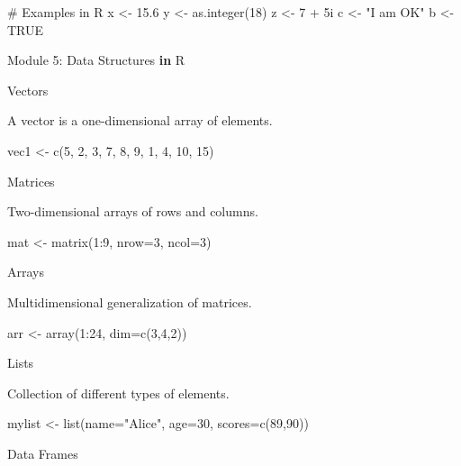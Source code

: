 \documentclass[
  letterpaper,
  DIV=11,
  numbers=noendperiod]{scrreprt}
\newenvironment{Shaded}{\begin{snugshade}}{\end{snugshade}}
\newcommand{\AttributeTok}[1]{\textcolor[rgb]{0.40,0.45,0.13}{#1}}
\newcommand{\CommentTok}[1]{\textcolor[rgb]{0.37,0.37,0.37}{#1}}
\newcommand{\ConstantTok}[1]{\textcolor[rgb]{0.56,0.35,0.01}{#1}}
\newcommand{\ControlFlowTok}[1]{\textcolor[rgb]{0.00,0.23,0.31}{\textbf{#1}}}
\newcommand{\DecValTok}[1]{\textcolor[rgb]{0.68,0.00,0.00}{#1}}
\newcommand{\FloatTok}[1]{\textcolor[rgb]{0.68,0.00,0.00}{#1}}
\newcommand{\FunctionTok}[1]{\textcolor[rgb]{0.28,0.35,0.67}{#1}}
\newcommand{\NormalTok}[1]{\textcolor[rgb]{0.00,0.23,0.31}{#1}}
\newcommand{\OtherTok}[1]{\textcolor[rgb]{0.00,0.23,0.31}{#1}}
\newcommand{\SpecialCharTok}[1]{\textcolor[rgb]{0.37,0.37,0.37}{#1}}
\newcommand{\StringTok}[1]{\textcolor[rgb]{0.13,0.47,0.30}{#1}}
\begin{document}
\begin{Shaded}
\begin{Highlighting}[]
\CommentTok{\# Examples in R}
\NormalTok{x }\OtherTok{\textless{}{-}} \FloatTok{15.6}
\NormalTok{y }\OtherTok{\textless{}{-}} \FunctionTok{as.integer}\NormalTok{(}\DecValTok{18}\NormalTok{)}
\NormalTok{z }\OtherTok{\textless{}{-}} \DecValTok{7} \SpecialCharTok{+} \DecValTok{5}\NormalTok{i}
\NormalTok{c }\OtherTok{\textless{}{-}} \StringTok{"I am OK"}
\NormalTok{b }\OtherTok{\textless{}{-}} \ConstantTok{TRUE}


\NormalTok{Module }\DecValTok{5}\SpecialCharTok{:}\NormalTok{ Data Structures }\ControlFlowTok{in}\NormalTok{ R}

\NormalTok{Vectors}

\NormalTok{A vector is a one}\SpecialCharTok{{-}}\NormalTok{dimensional array of elements.}

\NormalTok{vec1 }\OtherTok{\textless{}{-}} \FunctionTok{c}\NormalTok{(}\DecValTok{5}\NormalTok{, }\DecValTok{2}\NormalTok{, }\DecValTok{3}\NormalTok{, }\DecValTok{7}\NormalTok{, }\DecValTok{8}\NormalTok{, }\DecValTok{9}\NormalTok{, }\DecValTok{1}\NormalTok{, }\DecValTok{4}\NormalTok{, }\DecValTok{10}\NormalTok{, }\DecValTok{15}\NormalTok{)}

\NormalTok{Matrices}

\NormalTok{Two}\SpecialCharTok{{-}}\NormalTok{dimensional arrays of rows and columns.}

\NormalTok{mat }\OtherTok{\textless{}{-}} \FunctionTok{matrix}\NormalTok{(}\DecValTok{1}\SpecialCharTok{:}\DecValTok{9}\NormalTok{, }\AttributeTok{nrow=}\DecValTok{3}\NormalTok{, }\AttributeTok{ncol=}\DecValTok{3}\NormalTok{)}

\NormalTok{Arrays}

\NormalTok{Multidimensional generalization of matrices.}

\NormalTok{arr }\OtherTok{\textless{}{-}} \FunctionTok{array}\NormalTok{(}\DecValTok{1}\SpecialCharTok{:}\DecValTok{24}\NormalTok{, }\AttributeTok{dim=}\FunctionTok{c}\NormalTok{(}\DecValTok{3}\NormalTok{,}\DecValTok{4}\NormalTok{,}\DecValTok{2}\NormalTok{))}

\NormalTok{Lists}

\NormalTok{Collection of different types of elements.}

\NormalTok{mylist }\OtherTok{\textless{}{-}} \FunctionTok{list}\NormalTok{(}\AttributeTok{name=}\StringTok{"Alice"}\NormalTok{, }\AttributeTok{age=}\DecValTok{30}\NormalTok{, }\AttributeTok{scores=}\FunctionTok{c}\NormalTok{(}\DecValTok{89}\NormalTok{,}\DecValTok{90}\NormalTok{))}

\NormalTok{Data Frames}


\end{Highlighting}
\end{Shaded}
\end{document}
